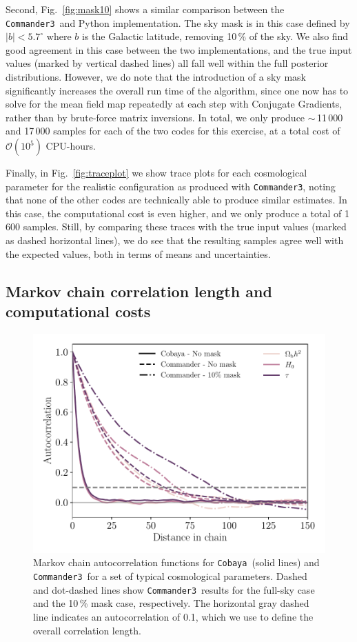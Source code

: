 \documentclass[twocolumn]{../common/aa}
\def\commanderthree{\texttt{Commander3}}
\def\cobaya{\texttt{Cobaya}}
\begin{document}
Second, Fig.~\ref{fig:mask10} shows a similar comparison between the \commanderthree\ and Python implementation. The sky mask is in this case defined by $|b|<5.7^{\circ}$ where $b$ is the Galactic latitude, removing 10\,\% of the sky. We also find good agreement in this case between the two implementations, and the true input values (marked by vertical dashed lines) all fall well within the full posterior distributions. However, we do note that the introduction of a sky mask significantly increases the overall run time of the algorithm, since one now has to solve for the mean field map repeatedly at each step with Conjugate Gradients, rather than by brute-force matrix inversions. In total, we only produce $\sim$\,11\,000 and 17\,000 samples for each of the two codes for this exercise, at a total cost of $\mathcal{O}(10^5)$ CPU-hours.

Finally, in Fig.~\ref{fig:traceplot} we show trace plots for each cosmological parameter for the realistic configuration as produced with \commanderthree, noting that none of the other codes are technically able to produce similar estimates. In this case, the computational cost is even higher, and we only produce a total of 1\,600 samples. Still, by comparing these traces with the true input values (marked as dashed horizontal lines), we do see that the resulting samples agree well with the expected values, both in terms of means and uncertainties. 

\subsection{Markov chain correlation length and computational costs}
\label{sec:resources}

\begin{figure}
	\centering
	\includegraphics[width=\linewidth]{figures/auto_correlation.pdf}
	\caption{\label{fig:autocorrelation}Markov chain autocorrelation functions for \cobaya\ (solid lines) and \commanderthree\ for a set of typical cosmological parameters. Dashed and dot-dashed lines show \commanderthree\ results for the full-sky case and the 10\,\% mask case, respectively. The horizontal gray dashed line indicates an autocorrelation of 0.1, which we use to define the overall correlation length.   }
\end{figure}
\end{document}
